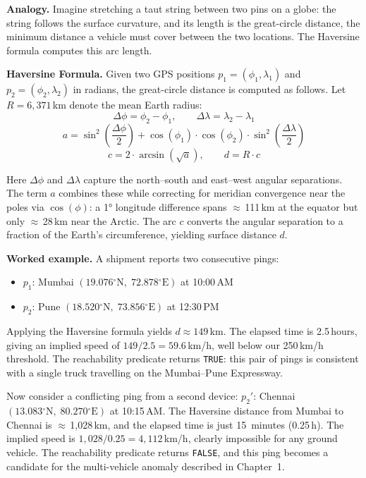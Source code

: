 \textbf{Analogy.} Imagine stretching a taut string between two pins on a globe: the string follows the surface curvature, and its length is the great-circle distance, the minimum distance a vehicle must cover between the two locations. The Haversine formula computes this arc length.

\textbf{Haversine Formula.} Given two GPS positions $p_1 = (\phi_1, \lambda_1)$ and $p_2 = (\phi_2, \lambda_2)$ in radians, the great-circle distance is computed as follows. Let $R = 6{,}371$\,km denote the mean Earth radius:
\[
\Delta\phi = \phi_2 - \phi_1, \qquad \Delta\lambda = \lambda_2 - \lambda_1
\]
\[
a = \sin^2\!\left(\frac{\Delta\phi}{2}\right) + \cos(\phi_1) \cdot \cos(\phi_2) \cdot \sin^2\!\left(\frac{\Delta\lambda}{2}\right)
\]
\[
c = 2 \cdot \arcsin\!\left(\sqrt{a}\right), \qquad d = R \cdot c
\]

Here $\Delta\phi$ and $\Delta\lambda$ capture the north--south and east--west angular separations. The term $a$ combines these while correcting for meridian convergence near the poles via $\cos(\phi)$: a 1° longitude difference spans $\approx$\,111\,km at the equator but only $\approx$\,28\,km near the Arctic. The arc $c$ converts the angular separation to a fraction of the Earth's circumference, yielding surface distance $d$.

\textbf{Worked example.} A shipment reports two consecutive pings:
\begin{itemize}
    \item $p_1$: Mumbai $(19.076{^\circ}\text{N},\; 72.878{^\circ}\text{E})$ at 10:00\,AM
    \item $p_2$: Pune $(18.520{^\circ}\text{N},\; 73.856{^\circ}\text{E})$ at 12:30\,PM
\end{itemize}
Applying the Haversine formula yields $d \approx 149$\,km. The elapsed time is 2.5\,hours, giving an implied speed of $149 / 2.5 = 59.6$\,km/h, well below our 250\,km/h threshold. The reachability predicate returns \texttt{TRUE}: this pair of pings is consistent with a single truck travelling on the Mumbai--Pune Expressway.

Now consider a conflicting ping from a second device: $p_2'$: Chennai $(13.083{^\circ}\text{N},\; 80.270{^\circ}\text{E})$ at 10:15\,AM. The Haversine distance from Mumbai to Chennai is $\approx$\,1{,}028\,km, and the elapsed time is just 15~minutes (0.25\,h). The implied speed is $1{,}028 / 0.25 = 4{,}112$\,km/h, clearly impossible for any ground vehicle. The reachability predicate returns \texttt{FALSE}, and this ping becomes a candidate for the multi-vehicle anomaly described in Chapter~1.


